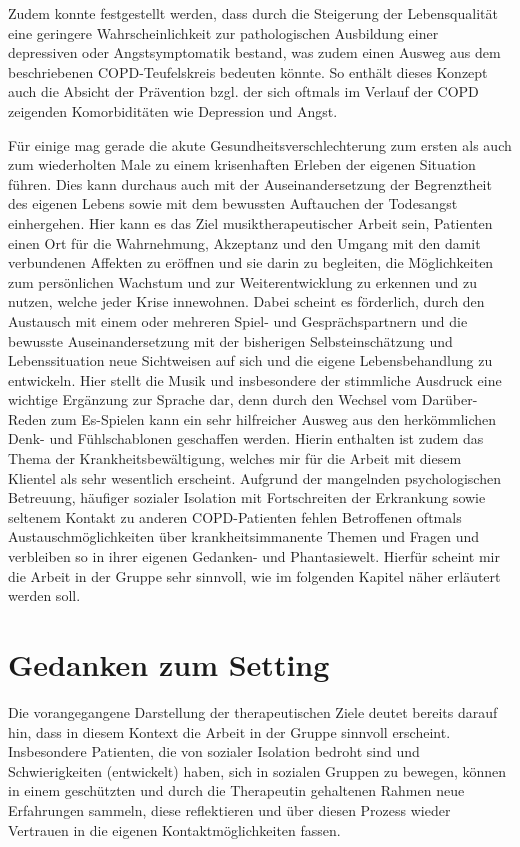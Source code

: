 Zudem konnte festgestellt werden, dass durch die Steigerung der Lebensqualität eine geringere Wahrscheinlichkeit zur pathologischen Ausbildung einer depressiven oder Angstsymptomatik bestand, was zudem einen Ausweg aus dem beschriebenen COPD-Teufelskreis bedeuten könnte. So enthält dieses Konzept auch die Absicht der Prävention bzgl. der sich oftmals im Verlauf der COPD zeigenden Komorbiditäten wie Depression und Angst.

Für einige mag gerade die akute Gesundheitsverschlechterung zum ersten als auch zum wiederholten Male zu einem krisenhaften Erleben der eigenen Situation führen. Dies kann durchaus auch mit der Auseinandersetzung der Begrenztheit des eigenen Lebens sowie mit dem bewussten Auftauchen der Todesangst einhergehen. Hier kann es das Ziel musiktherapeutischer Arbeit sein, Patienten einen Ort für die Wahrnehmung, Akzeptanz und den Umgang mit den damit verbundenen Affekten zu eröffnen und sie darin zu begleiten, die Möglichkeiten zum persönlichen Wachstum und zur Weiterentwicklung zu erkennen und zu nutzen, welche jeder Krise innewohnen. Dabei scheint es förderlich, durch den Austausch mit einem oder mehreren Spiel- und Gesprächspartnern und die bewusste Auseinandersetzung mit der bisherigen Selbsteinschätzung und Lebenssituation neue Sichtweisen auf sich und die eigene Lebensbehandlung zu entwickeln. Hier stellt die Musik und insbesondere der stimmliche Ausdruck eine wichtige Ergänzung zur Sprache dar, denn durch den Wechsel vom Darüber-Reden zum Es-Spielen kann ein sehr hilfreicher Ausweg aus den herkömmlichen Denk- und Fühlschablonen geschaffen werden. Hierin enthalten ist zudem das Thema der Krankheitsbewältigung, welches mir für die Arbeit mit diesem Klientel als sehr wesentlich erscheint. Aufgrund der mangelnden psychologischen Betreuung, häufiger sozialer Isolation mit Fortschreiten der Erkrankung sowie seltenem Kontakt zu anderen COPD-Patienten fehlen Betroffenen oftmals Austauschmöglichkeiten über krankheitsimmanente Themen und Fragen und verbleiben so in ihrer eigenen Gedanken- und Phantasiewelt. Hierfür scheint mir die Arbeit in der Gruppe sehr sinnvoll, wie im folgenden Kapitel näher erläutert werden soll.

\section{Gedanken zum Setting}
\label{section:gedanken_zum_setting}
Die vorangegangene Darstellung der therapeutischen Ziele deutet bereits darauf hin, dass in diesem Kontext die Arbeit in der Gruppe sinnvoll erscheint. Insbesondere Patienten, die von sozialer Isolation bedroht sind und Schwierigkeiten (entwickelt) haben, sich in sozialen Gruppen zu bewegen, können in einem geschützten und durch die Therapeutin gehaltenen Rahmen neue Erfahrungen sammeln, diese reflektieren und über diesen Prozess wieder Vertrauen in die eigenen Kontaktmöglichkeiten fassen.

